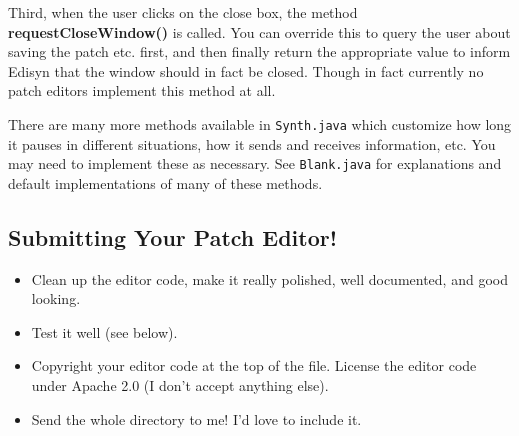\documentclass{article}
\begin{document}
Third, when the user clicks on the close box, the method {\bf requestCloseWindow()} is called.  You can override this to query the user about saving the patch etc. first, and then finally return the appropriate value to inform Edisyn that the window should in fact be closed.  Though in fact currently no patch editors implement this method at all.

There are many more methods available in {\tt Synth.java} which customize how long it pauses in different situations, how it sends and receives information, etc.  You may need to implement these as necessary.  See {\tt Blank.java} for explanations and default implementations of many of these methods.

\subsection{Submitting Your Patch Editor!}

\begin{itemize}
\item Clean up the editor code, make it really polished, well documented, and good looking.
\item Test it well (see below).
\item Copyright your editor code at the top of the file.  License the editor code under Apache 2.0 (I don't accept anything else).
\item Send the whole directory to me!  I'd love to include it.
\end{itemize}
\end{document}
